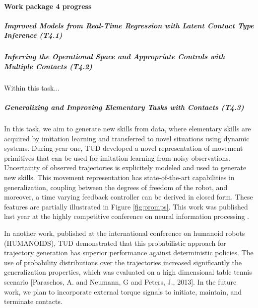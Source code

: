 

\paragraph{Work package 4 progress}

\subparagraph{Improved Models from Real-Time Regression with Latent Contact Type Inference (T4.1)}



\subparagraph{Inferring the Operational Space and Appropriate Controls with Multiple Contacts (T4.2)}

Within this task...


\subparagraph{Generalizing and Improving Elementary Tasks with Contacts (T4.3)}

In this task, we aim to generate new skills from data, where elementary skills 
are acquired by imitation learning and transferred to novel situations using 
dynamic systems. During year one, TUD developed a novel representation of 
movement primitives that can be used for imitation learning from noisy observations.
Uncertainty of observed trajectories is explicitely modeled and used to generate new skills.
This movement representation has state-of-the-art capabilities in generalization, 
coupling between the degrees of freedom of the robot, and moreover, 
a time varying feedback controller can be derived in closed form. 
These features are partially illustrated in Figure \ref{fig:promps}.
This work was published
last year at the highly competitive conference on neural information processing \cite{Paraschos_NIPS_2013}.


In another work, published at the international conference on humanoid robots (HUMANOIDS), 
TUD demonstrated that this probabilistic approach for trajectory generation
has superior performance against deterministic policies. The use of
probability distributions over the trajectories increased significantly
 the generalization properties, which was evaluated on a high dimensional table
tennis scenario [Paraschos, A. and  Neumann, G and  Peters, J., 2013]. 
In the future work, we plan to incorporate external torque signals to initiate, 
maintain, and terminate contacts.

